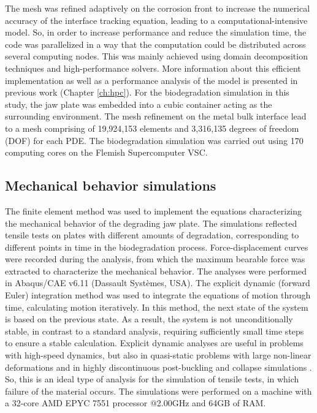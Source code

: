 The mesh was refined adaptively on the corrosion front to increase the numerical accuracy of the interface tracking equation, leading to a computational-intensive model. So, in order to increase performance and reduce the simulation time, the code was parallelized in a way that the computation could be distributed across several computing nodes. This was mainly achieved using domain decomposition techniques and high-performance solvers. More information about this efficient implementation as well as a performance analysis of the model is presented in previous work \cite{Barzegari2022} (Chapter \ref{ch:hpc}). For the biodegradation simulation in this study, the jaw plate was embedded into a cubic container acting as the surrounding environment. The mesh refinement on the metal bulk interface lead to a mesh comprising of 19,924,153 elements and 3,316,135 degrees of freedom (\gls{DOF}) for each \gls{PDE}. The biodegradation simulation was carried out using 170 computing cores on the Flemish Supercomputer VSC.


\subsection{Mechanical behavior simulations}
\label{sec:FEA}

The finite element method was used to implement the equations characterizing the mechanical behavior of the degrading jaw plate. The simulations reflected tensile tests on plates with different amounts of degradation, corresponding to different points in time in the biodegradation process. Force-displacement curves were recorded during the analysis, from which the maximum bearable force was extracted to characterize the mechanical behavior. The analyses were performed in Abaqus/CAE v6.11 (Dassault Systèmes, USA). The explicit dynamic (forward Euler) integration method was used to integrate the equations of motion through time, calculating motion iteratively. In this method, the next state of the system is based on the previous state. As a result, the system is not unconditionally stable, in contrast to a standard analysis, requiring sufficiently small time steps to ensure a stable calculation. Explicit dynamic analyses are useful in problems with high-speed dynamics, but also in quasi-static problems with large non-linear deformations and in highly discontinuous post-buckling and collapse simulations \cite{explicit2}. So, this is an ideal type of analysis for the simulation of tensile tests, in which failure of the material occurs. The simulations were performed on a machine with a 32-core AMD EPYC 7551 processor @2.00GHz and 64GB of RAM.

